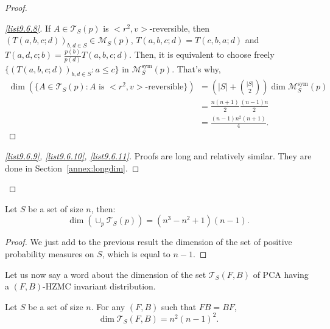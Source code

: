 \documentclass[AHL,Unicode,longabstracts]{cedram}
\newcounter{a}
\newcommand{\triang}[2]{\mathcal{T}_{#1} \left(#2 \right)}
\DeclareMathOperator{\sym}{sym}
\begin{document}
\begin{proof}
\begin{proof}[{\eqref{list9.6.8}}]If $A \in \triang{S}{p}$ is $<r^2,v>$-reversible, then $(T(a,b,c;d))_{b,d \in S} \in \mathcal{M}_S(p)$, $T(a,b,c;d) = T(c,b,a;d)$ and $T(a,d,c;b) = \frac{p(b)}{p(d)} T(a,b,c;d)$. Then, it is equivalent to choose freely $\{ (T(a,b,c;d))_{b,d \in S} : a \leq c \}$ in $\mathcal{M}^{\sym}_S(p)$. That's why,
\begin{align*}
\dim \left(\{A \in \triang{S}{p} : \text{$A$ is $<r^2,v>$-reversible}\} \right) & = \left(|S| + \binom{|S|}{2} \right) \dim \mathcal{M}^{\sym}_S(p) \\
& = \frac{n(n+1)}{2} \frac{(n-1) n}{2} \\
& = \frac{(n-1)n^2(n+1)}{4}.
\end{align*}
\let\qed\relax
\end{proof}

\begin{proof}[{\eqref{list9.6.9}}, {\eqref{list9.6.10}}, {\eqref{list9.6.11}}]
Proofs are long and relatively similar. They are done in Section~\ref{annex:longdim}.
\end{proof}
\let\qed\relax
\end{proof}

\begin{coro}\label{cor:dimp}
Let $S$ be a set of size $n$, then:
\[
\dim \left(\cup_p \triang{S}{p} \right) = (n^3-n^2+1)(n-1).
\]
\end{coro}

\begin{proof}
We just add to the previous result the dimension of the set of positive probability measures on $S$, which is equal to $n-1$.
\end{proof}

Let us now say a word about the dimension of the set $\triang{S}{F,B}$ of PCA having a $(F,B)$-HZMC invariant distribution.

\begin{prop}
Let $S$ be a set of size $n$. For any $(F,B)$ such that $FB=BF$,
\begin{equation*}
\dim \triang{S}{F,B} = n^2 (n-1)^2.
\end{equation*}
\end{prop}

\end{document}
